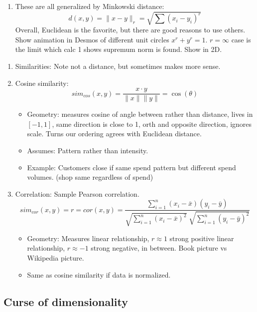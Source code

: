 \documentclass{article}
\begin{document}
\begin{enumerate}
\begin{enumerate}
\item These are all generalized by Minkowski distance:
\[
d(x,y) = \|x-y\|_r = \sqrt{\sum (x_i-y_i)^r} 
\]
Overall, Euclidean is the favorite, but there are good reasons to use others. Show animation in Desmos of different unit circles $x^r+y^r = 1$. $r=\infty$ case is the limit which calc 1 shows supremum norm is found. Show in 2D.
\end{enumerate}

\begin{enumerate}
\item Similarities: Note not a distance, but sometimes makes more sense.

\item Cosine similarity: 
\[
sim_{cos}(x,y) = \frac{x \cdot y}{\|x\| \|y\|} = \cos(\theta)
\]
\begin{itemize}
\item Geometry: measures cosine of angle between rather than distance, lives in $[-1,1]$, same direction is close to 1, orth and opposite direction, ignores scale. Turns our ordering agrees with Euclidean distance.
\item Assumes: Pattern rather than intensity.
\item Example: Customers close if same spend pattern but different spend volumes. (shop same regardless of spend)
\end{itemize}

\item Correlation: Sample Pearson correlation.
\[
sim_{cor}(x,y) = r = cor(x,y) =
\frac{\sum_{i=1}^n (x_i - \bar{x})(y_i - \bar{y})}
{\sqrt{\sum_{i=1}^n (x_i - \bar{x})^2}\;
 \sqrt{\sum_{i=1}^n (y_i - \bar{y})^2}}
\]
\begin{itemize}
\item Geometry: Measures linear relationship, $r\approx 1$ strong positive linear relationship, $r \approx -1$ strong negative, in between. Book picture vs Wikipedia picture.
\item Same as cosine similarity if data is normalized.
\end{itemize}

\end{enumerate}
\end{enumerate}


\subsection*{Curse of dimensionality}
\end{document}
